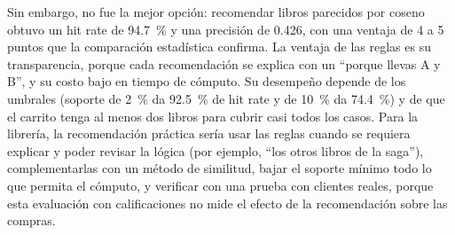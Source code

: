 \documentclass[11pt,letterpaper]{article}
\begin{document}
Sin embargo, no fue la mejor opción: recomendar libros parecidos por coseno obtuvo un hit rate de 94.7~\% y una precisión de 0.426, con una ventaja de 4 a 5 puntos que la comparación estadística confirma. La ventaja de las reglas es su transparencia, porque cada recomendación se explica con un ``porque llevas A y B'', y su costo bajo en tiempo de cómputo. Su desempeño depende de los umbrales (soporte de 2~\% da 92.5~\% de hit rate y de 10~\% da 74.4~\%) y de que el carrito tenga al menos dos libros para cubrir casi todos los casos. Para la librería, la recomendación práctica sería usar las reglas cuando se requiera explicar y poder revisar la lógica (por ejemplo, ``los otros libros de la saga''), complementarlas con un método de similitud, bajar el soporte mínimo todo lo que permita el cómputo, y verificar con una prueba con clientes reales, porque esta evaluación con calificaciones no mide el efecto de la recomendación sobre las compras.

\end{document}
